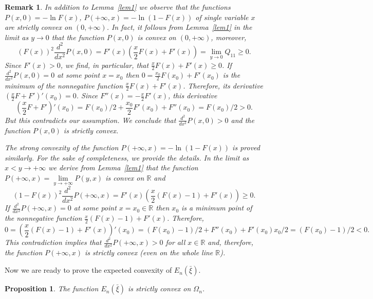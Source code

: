 \documentclass[10pt,a4paper]{amsart}
\newtheorem{proposition}{Proposition}[section]
\newtheorem{remark}{Remark}[section]
\numberwithin{equation}{section}
\newcommand{\R}{{\mathbb R}}
\begin{document}
\begin{remark}\label{rem1}
In addition to Lemma~\ref{lem1} we observe that the functions $P(x,0)=-\ln F(x)$, $P(+\infty,x)=-\ln(1-F(x))$
of single variable $x$ are strictly convex on $(0,+\infty)$. In fact, it follows from Lemma~\ref{lem1} in the limit as $y\to 0$ that the function $P(x,0)$ is convex on $(0,+\infty)$, moreover,
\[
(F(x))^2\frac{d^2}{dx^2}P(x,0)=F'(x)(\frac{x}{2}F(x)+F'(x))=\lim_{y\to 0}Q_{11}\ge 0.
\]
Since $F'(x)>0$, we find, in particular, that $\frac{x}{2}F(x)+F'(x)\ge 0$.
If $\frac{d^2}{dx^2}P(x,0)=0$ at some point $x=x_0$ then $0=\frac{x_0}{2}F(x_0)+F'(x_0)$ is the minimum of the nonnegative function $\frac{x}{2}F(x)+F'(x)$. Therefore, its derivative $(\frac{x}{2}F+F')'(x_0)=0$. Since $F''(x)=-\frac{x}{2}F'(x)$, this derivative
\[
(\frac{x}{2}F+F')'(x_0)=F(x_0)/2+\frac{x_0}{2}F'(x_0)+F''(x_0)=F(x_0)/2>0.
\]
But this contradicts our assumption. We conclude that $\frac{d^2}{dx^2}P(x,0)>0$ and the function $P(x,0)$ is strictly convex.

The strong convexity of the function $P(+\infty,x)=-\ln(1-F(x))$ is proved similarly. For the sake of completeness, we
provide the details.
In the limit as $x<y\to+\infty$ we derive from Lemma~\ref{lem1} that the function $P(+\infty,x)=\lim\limits_{y\to+\infty}P(y,x)$ is convex on $\R$ and
\[(1-F(x))^2\frac{d^2}{dx^2}P(+\infty,x)=F'(x)(\frac{x}{2}(F(x)-1)+F'(x))\ge 0.\]
If $\displaystyle\frac{d^2}{dx^2}P(+\infty,x)=0$ at some point $x=x_0\in\R$ then $x_0$ is a minimum point of the nonnegative function
$\frac{x}{2}(F(x)-1)+F'(x)$. Therefore,
\[
0=(\frac{x}{2}(F(x)-1)+F'(x))'(x_0)=(F(x_0)-1)/2+F''(x_0)+F'(x_0)x_0/2=(F(x_0)-1)/2<0.
\]
This contradiction implies that $\displaystyle\frac{d^2}{dx^2}P(+\infty,x)>0$ for all $x\in\R$ and, therefore, the function $P(+\infty,x)$ is strictly convex (even on the whole line $\R$).
\end{remark}

Now we are ready to prove the expected convexity of $E_n(\bar\xi)$.

\begin{proposition}\label{th2}
The function $E_n(\bar\xi)$ is strictly convex on $\Omega_n$.
\end{proposition}
\end{document}
